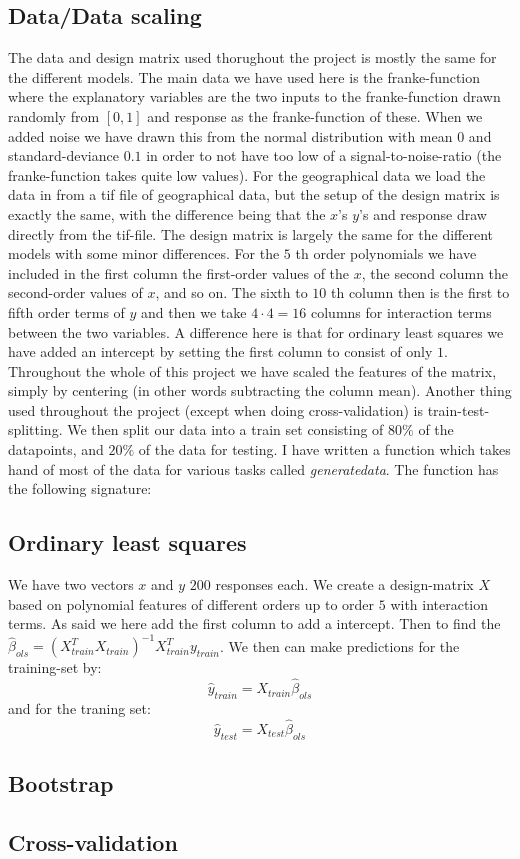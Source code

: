 \documentclass{article}
\begin{document}
\subsection{Data/Data scaling}
The data and design matrix used thorughout the project is mostly the same for
the different models. The main data we have used here is the franke-function
where the explanatory variables are the two inputs to the franke-function drawn
randomly from $\left[ 0, 1 \right]$ and response as the franke-function of
these. When we added noise we have drawn this from the normal distribution with
mean $0$ and standard-deviance $0.1$ in order to not have too low of a
signal-to-noise-ratio (the franke-function takes quite low values). For the
geographical data we load the data in from a tif file of geographical data, but
the setup of the design matrix is exactly the same, with the difference being
that the $x$'s $y$'s and response draw directly from the tif-file. The design
matrix is largely the same for the different models with some minor differences.
For the $5$ th order polynomials we have included in the first column the
first-order values of the $x$, the second column the second-order values of $x$,
and so on. The sixth to $10$ th column then is the first to fifth order terms of
$y$ and then we take $4 \cdot 4 = 16$ columns for interaction terms between the
two variables. A difference here is that for ordinary least squares we have
added an intercept by setting the first column to consist of only $1$.
Throughout the whole of this project we have scaled the features of the matrix,
simply by centering (in other words subtracting the column mean). Another thing
used throughout the project (except when doing cross-validation) is
train-test-splitting. We then split our data into a train set consisting of
$80\%$ of the datapoints, and $20\%$ of the data for testing. I have written a
function which takes hand of most of the data for various tasks called
\textit{generatedata}. The function has the following signature:

\subsection{Ordinary least squares}
We have two vectors $x$ and $y$ $200$ responses each. We create a design-matrix
$X$ based on polynomial features of different orders up to order $5$ with
interaction terms. As said we here add the first column to add a intercept. Then
to find the $\hat{\beta}_{ols} = (X^T_{train} X_{train})^{-1} X^T_{train}
    y_{train}$. We then can make predictions for the training-set by:
$$\hat{y}_{train} = X_{train} \hat{\beta}_{ols}$$
and for the traning set:
$$\hat{y}_{test} = X_{test} \hat{\beta}_{ols}$$

\subsection{Bootstrap}

\subsection{Cross-validation}


\end{document}
